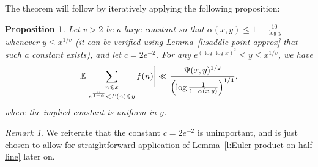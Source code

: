 \documentclass[12pt,a4paper,reqno]{amsart}
\numberwithin{equation}{section}
\def\E{\mathbb E}
\def\leq {\leqslant}
\newtheorem{proposition}[theorem]{Proposition}
\theoremstyle{remark}
\newtheorem*{xremark}{Remark}
\theoremstyle{definition}
\numberwithin{equation}{section}
\theoremstyle{remark}
\def\E{\mathbb E}
\begin{document}
The theorem will follow by iteratively applying the following proposition:
\begin{proposition}\label{p:small u upper bound}
Let $v>2$ be a large constant so that $\alpha (x,y) \leq 1 - \frac{10}{\log y}$ whenever $y \leq x^{1/v}$ (it can be verified using Lemma~\ref{l:saddle point approx} that such a constant exists), and let $c = 2 e^{-2}$.  For any $e^{(\log \log x)^{2}} \leq y \leq x^{1/v}$, we have
\[
\E \biggl| \sum_{\substack{n \leq x \\ e^{\frac{c}{1-\alpha}} < P(n) \leq y}} f(n) \biggr| \ll \frac{\Psi (x,y)^{1/2}}{\Bigl(\log \frac{1}{1-\alpha(x,y)} \Bigr)^{1/4}},
\]
where the implied constant is uniform in $y$. 
\end{proposition}
\begin{xremark}
We reiterate that the constant $c = 2 e^{-2}$ is unimportant, and is just chosen to allow for straightforward application of Lemma~\ref{l:Euler product on half line} later on.
\end{xremark}
\end{document}
